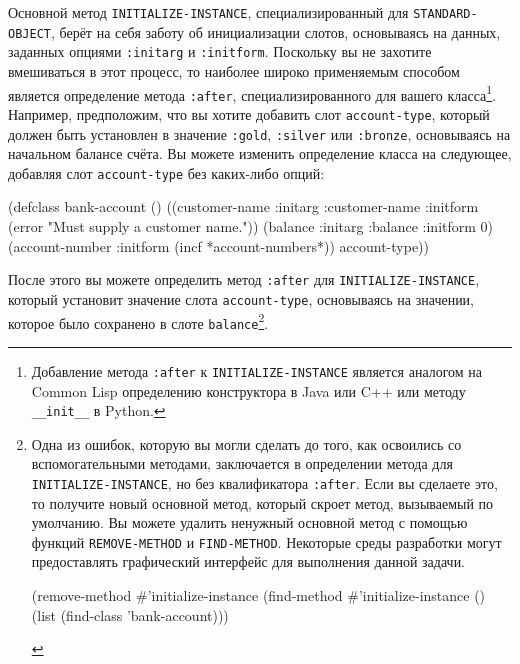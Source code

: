 Основной метод \lstinline{INITIALIZE-INSTANCE}, специализированный для \lstinline{STANDARD-OBJECT},
берёт на себя заботу об инициализации слотов, основываясь на данных, заданных опциями
\lstinline{:initarg} и \lstinline{:initform}.  Поскольку вы не захотите вмешиваться в этот процесс,
то наиболее широко применяемым способом является определение метода \lstinline{:after},
специализированного для вашего класса\footnote{Добавление метода \lstinline{:after} к
  \lstinline{INITIALIZE-INSTANCE} является аналогом на Common Lisp определению конструктора в
  Java или C++ или методу \lstinline!__init__! в Python.}\hspace{\footnotenegspace}.  Например, предположим, что вы
хотите добавить слот \lstinline{account-type}, который должен быть установлен в значение
\lstinline{:gold}, \lstinline{:silver} или \lstinline{:bronze}, основываясь на начальном балансе счёта.
Вы можете изменить определение класса на следующее, добавляя слот \lstinline{account-type} без
каких-либо опций:

\begin{myverb}
(defclass bank-account ()
  ((customer-name
    :initarg :customer-name
    :initform (error "Must supply a customer name."))
   (balance
    :initarg :balance
    :initform 0)
   (account-number
    :initform (incf *account-numbers*))
   account-type))
\end{myverb}

После этого вы можете определить метод \lstinline{:after} для \lstinline{INITIALIZE-INSTANCE},
который установит значение слота \lstinline{account-type}, основываясь на значении, которое
было сохранено в слоте \lstinline{balance}\footnote{Одна из ошибок, которую вы могли сделать
  до того, как освоились со вспомогательными методами, заключается в определении метода для
  \lstinline{INITIALIZE-INSTANCE}, но без квалификатора \lstinline{:after}.  Если вы сделаете это,
  то получите новый основной метод, который скроет метод, вызываемый по умолчанию.  Вы
  можете удалить ненужный основной метод с помощью функций \lstinline{REMOVE-METHOD} и
  \lstinline{FIND-METHOD}.  Некоторые среды разработки могут предоставлять графический
  интерфейс для выполнения данной задачи.

\begin{myverb}
(remove-method #'initialize-instance
  (find-method #'initialize-instance () (list (find-class 'bank-account)))
\end{myverb}
}\hspace{\footnotenegspace}.

